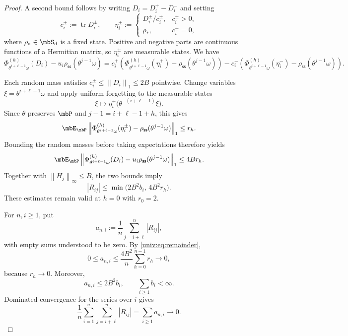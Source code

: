 \documentclass[a4paper]{article}
\numberwithin{equation}{section}   %
\theoremstyle{plain}   %
\theoremstyle{plain}   %
\theoremstyle{examplestyle}
\DeclareMathOperator{\states}{\mbS_d}   %
\DeclareMathOperator{\pr}{\mbP}           %
\newcommand{\s}{\rho_{\mathsf{ss}}}     %
\DeclareMathOperator{\str}{tr} %
\newcommand{\unorm}[1]{\left\lVert#1\right\rVert}
\begin{document}
\begin{proof}
    A second bound follows by writing $D_i=D_i^+-D_i^-$ and setting
    \[
        c_i^\pm:=\str D_i^\pm,
        \qquad
        \eta_i^\pm:=
        \begin{cases}
            D_i^\pm/c_i^\pm, & c_i^\pm>0,\\
            \rho_*, & c_i^\pm=0,
        \end{cases}
    \]
    where $\rho_*\in\states$ is a fixed state.
    Positive and negative parts are continuous functions of a Hermitian matrix, so $\eta_i^\pm$ are measurable states.
    We have
    \[
        \Phi^{(h)}_{\theta^{i+\ell-1}\omega}(D_i)
        -
        u_i\s(\theta^{j-1}\omega)
        =
        c_i^+
        \left(
            \Phi^{(h)}_{\theta^{i+\ell-1}\omega}(\eta_i^+)
            -
            \s(\theta^{j-1}\omega)
        \right)
        -
        c_i^-
        \left(
            \Phi^{(h)}_{\theta^{i+\ell-1}\omega}(\eta_i^-)
            -
            \s(\theta^{j-1}\omega)
        \right).
    \]
    
    Each random mass satisfies $c_i^\pm\le\unorm{D_i}_1\le2B$ pointwise.
    Change variables $\xi=\theta^{i+\ell-1}\omega$ and apply uniform forgetting to the measurable states
    \[
        \xi\longmapsto
        \eta_i^\pm\bigl(\theta^{-(i+\ell-1)}\xi\bigr).
    \]
    Since $\theta$ preserves $\pr$ and $j-1=i+\ell-1+h$, this gives
    \[
        \mbE_{\pr}
        \unorm{
            \Phi^{(h)}_{\theta^{i+\ell-1}\omega}(\eta_i^\pm)
            -
            \s(\theta^{j-1}\omega)
        }_1
        \le r_h.
    \]
    Bounding the random masses before taking expectations therefore yields
    \[
        \mbE_{\pr}
        \unorm{
            \Phi^{(h)}_{\theta^{i+\ell-1}\omega}(D_i)
            -
            u_i\s(\theta^{j-1}\omega)
        }_1
        \le4Br_h.
    \]
    Together with $\unorm{H_j}_\infty\le B$, the two bounds imply
    \begin{equation}
    \label{univ:eq:remainder}
        |R_{ij}|
        \le
        \min\bigl(2B^2b_i,\,4B^2r_h\bigr).
    \end{equation}
    These estimates remain valid at $h=0$ with $r_0=2$.

    For $n,i\ge1$, put
    \[
        a_{n,i}:=\frac1n\sum_{j=i+\ell}^n|R_{ij}|,
    \]
    with empty sums understood to be zero.
    By \eqref{univ:eq:remainder},
    \[
        0\le a_{n,i}
        \le
        \frac{4B^2}{n}\sum_{h=0}^{n-1}r_h
        \longrightarrow0,
    \]
    because $r_h\to0$.
    Moreover,
    \[
        a_{n,i}\le2B^2b_i,
        \qquad
        \sum_{i\ge1}b_i<\infty.
    \]
    Dominated convergence for the series over $i$ gives
    \[
        \frac1n
        \sum_{i=1}^n\sum_{j=i+\ell}^n|R_{ij}|
        =
        \sum_{i\ge1}a_{n,i}
        \longrightarrow0.
    \]


\end{proof}
\end{document}
